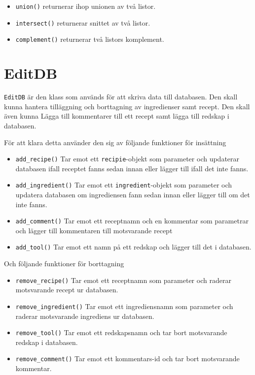 \begin{itemize}
\item   \verb+union()+ returnerar ihop unionen av två listor.
\item   \verb+intersect()+ returnerar snittet av två listor.
\item   \verb+complement()+ returnerar två listors komplement.
\end{itemize}


\section{EditDB}

\verb+EditDB+ är den klass som används för att skriva data till databasen. Den
skall kunna hantera tilläggning och borttagning av ingredienser samt recept. Den
skall även kunna Lägga till kommentarer till ett recept samt lägga till redskap
i databasen.

För att klara detta använder den sig av följande funktioner för insättning

\begin{itemize}
\item \verb+add_recipe()+ Tar emot ett \verb+recipie+-objekt som parameter och updaterar
  databasen ifall receptet fanns sedan innan eller lägger till ifall det inte
  fanns.

\item \verb+add_ingredient()+ Tar emot ett \verb+ingredient+-objekt som parameter
  och updatera databasen om ingrediensen fann sedan innan eller lägger till om
  det inte fanns.

\item \verb+add_comment()+ Tar emot ett receptnamn och en kommentar som
  parametrar och lägger till kommentaren till motsvarande recept

\item \verb+add_tool()+ Tar emot ett namn på ett redskap och lägger till det i
  databasen.

\end{itemize}


Och följande funktioner för borttagning

\begin{itemize}

\item \verb+remove_recipe()+ Tar emot ett receptnamn som parameter och raderar
  motsvarande recept ur databasen.

\item \verb+remove_ingredient()+ Tar emot ett ingrediensnamn som parameter och
  raderar motsvarande ingrediens ur databasen.

\item \verb+remove_tool()+ Tar emot ett redskapsnamn och tar bort motsvarande
  redskap i databasen.

\item \verb+remove_comment()+ Tar emot ett kommentars-id och tar bort
  motsvarande kommentar.
  
\end{itemize}

